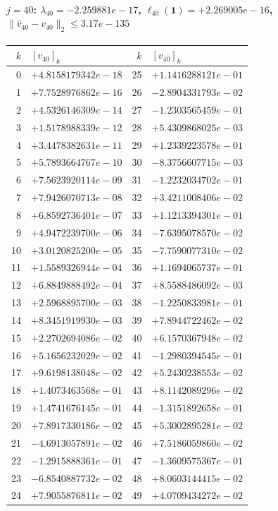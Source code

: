 \documentclass[11pt]{article}
\begin{document}
\paragraph{$j = 40$: $\lambda_{40} = -2.259881e-17$, \quad $\ell_{40}(\mathbf{1}) = +2.269005e-16$, \quad $\|\hat{v}_{40} - v_{40}\|_2 \leq 3.17e-135$}
\begin{center}
{\footnotesize
\begin{tabular}{r@{\;\;}l@{\quad}r@{\;\;}l}
\toprule
$k$ & $[v_{40}]_k$ & $k$ & $[v_{40}]_k$ \\
\midrule
0 & $+4.8158179342e-18$ & 25 & $+1.1416288121e-01$ \\
1 & $+7.7528976862e-16$ & 26 & $-2.8904331793e-02$ \\
2 & $+4.5326146309e-14$ & 27 & $-1.2303565459e-01$ \\
3 & $+1.5178988339e-12$ & 28 & $+5.4309868025e-03$ \\
4 & $+3.4478382631e-11$ & 29 & $+1.2339223578e-01$ \\
5 & $+5.7893664767e-10$ & 30 & $-8.3756607715e-03$ \\
6 & $+7.5623920114e-09$ & 31 & $-1.2232034702e-01$ \\
7 & $+7.9426070713e-08$ & 32 & $+3.4211008406e-02$ \\
8 & $+6.8592736401e-07$ & 33 & $+1.1213394301e-01$ \\
9 & $+4.9472239700e-06$ & 34 & $-7.6395078570e-02$ \\
10 & $+3.0120825200e-05$ & 35 & $-7.7590077310e-02$ \\
11 & $+1.5589326944e-04$ & 36 & $+1.1694065737e-01$ \\
12 & $+6.8849888492e-04$ & 37 & $+8.5588486092e-03$ \\
13 & $+2.5968895700e-03$ & 38 & $-1.2250833981e-01$ \\
14 & $+8.3451919930e-03$ & 39 & $+7.8944722462e-02$ \\
15 & $+2.2702694086e-02$ & 40 & $+6.1570367948e-02$ \\
16 & $+5.1656232029e-02$ & 41 & $-1.2980394545e-01$ \\
17 & $+9.6198138048e-02$ & 42 & $+5.2430238553e-02$ \\
18 & $+1.4073463568e-01$ & 43 & $+8.1142089296e-02$ \\
19 & $+1.4741676145e-01$ & 44 & $-1.3151892658e-01$ \\
20 & $+7.8917330186e-02$ & 45 & $+5.3002895281e-02$ \\
21 & $-4.6913057891e-02$ & 46 & $+7.5186059860e-02$ \\
22 & $-1.2915888361e-01$ & 47 & $-1.3609575367e-01$ \\
23 & $-6.8540887732e-02$ & 48 & $+8.0603144415e-02$ \\
24 & $+7.9055876811e-02$ & 49 & $+4.0709434272e-02$ \\
\bottomrule
\end{tabular}
}
\end{center}
\end{document}
